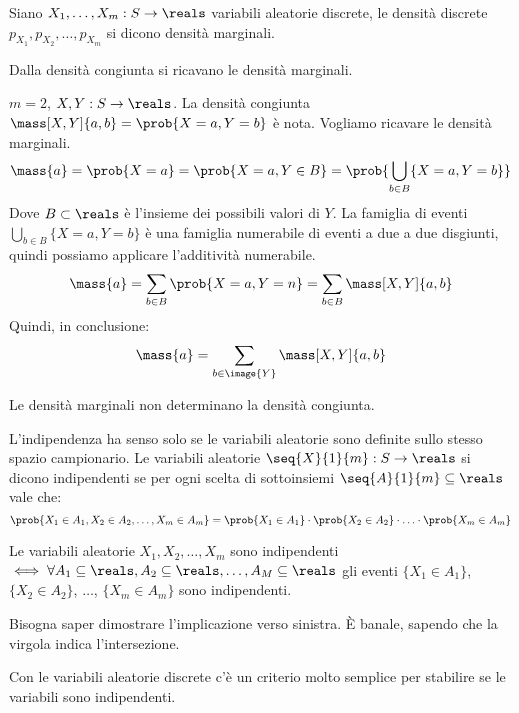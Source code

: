 Siano $X_1, \ldots, X_m : S \to \reals$ variabili aleatorie discrete, le densit\`a discrete $p_{X_1}, p_{X_2}, \ldots, p_{X_m}$ si dicono densit\`a marginali.

\begin{prop}
Dalla densit\`a congiunta si ricavano le densit\`a marginali.
\end{prop}
\begin{exmp}
$m = 2$, $X, Y : S \to \reals$. La densit\`a congiunta $\mass[X,Y]{a,b} = \prob{X = a, Y = b}$ \`e nota. Vogliamo ricavare le densit\`a marginali.
\[
\mass{a} = \prob{X = a} = \prob{X = a, Y \in B} = 
\prob{ \bigcup_{b \in B} \{X = a, Y = b\}}
\]
Dove $B \subset \reals$ \`e l'insieme dei possibili valori di $Y$. La famiglia di eventi $\bigcup_{b \in B} \{X = a, Y = b\}$ \`e una famiglia numerabile di eventi a due a due disgiunti, quindi possiamo applicare l'additivit\`a numerabile.
\[
\mass{a} = \sum_{b \in B} \prob{X = a, Y = n} = \sum_{b \in B} \mass[X,Y]{a,b}
\]
Quindi, in conclusione:
\[
\mass{a} = \sum_{b \in \image{Y}} \mass[X,Y]{a,b}
\]
\end{exmp}

\begin{oss}
Le densit\`a marginali non determinano la densit\`a congiunta.
\end{oss}

\begin{defn}
L'indipendenza ha senso solo se le variabili aleatorie sono definite sullo stesso spazio campionario. Le variabili aleatorie $\seq{X}{1}{m} : S \to \reals$ si dicono indipendenti se per ogni scelta di sottoinsiemi $\seq{A}{1}{m} \subseteq \reals$ vale che:
\[
\prob{X_1 \in A_1, X_2 \in A_2, \ldots, X_m \in A_m} = \prob{X_1 \in A_1} \cdot \prob{X_2 \in A_2} \cdot \ldots \cdot \prob{X_m \in A_m}
\]
\end{defn}

\begin{fact}
Le variabili aleatorie $X_1, X_2, \ldots, X_m$ sono indipendenti $\iff \forall A_1 \subseteq \reals, A_2 \subseteq \reals, \ldots, A_M \subseteq \reals$ gli eventi $\{X_1 \in A_1\}$, $\{X_2 \in A_2\}$, $\ldots$, $\{ X_m \in A_m\}$ sono indipendenti.
\end{fact}

Bisogna saper dimostrare l'implicazione verso sinistra. \`E banale, sapendo che la virgola indica l'intersezione.

Con le variabili aleatorie discrete c'\`e un criterio molto semplice per stabilire se le variabili sono indipendenti.

